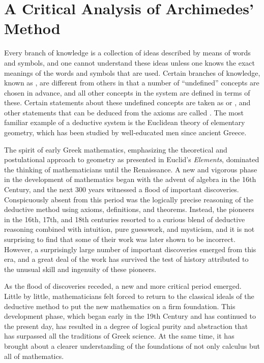 \section{A Critical Analysis of Archimedes' Method}\label{sec:1.1.5}

\begin{note}
  Every branch of knowledge is a collection of ideas described by means of words and symbols, and one cannot understand these ideas unless one knows the exact meanings of the words and symbols that are used.
  Certain branches of knowledge, known as \textbf{}, are different from others in that a number of ``undefined'' concepts are chosen in advance, and all other concepts in the system are defined in terms of these.
  Certain statements about these undefined concepts are taken as \textbf{} or \textbf{}, and other statements that can be deduced from the axioms are called \textbf{}.
  The most familiar example of a deductive system is the Euclidean theory of elementary geometry, which has been studied by well-educated men since ancient Greece.

  The spirit of early Greek mathematics, emphasizing the theoretical and postulational approach to geometry as presented in Euclid's \emph{Elements}, dominated the thinking of mathematicians until the Renaissance.
  A new and vigorous phase in the development of mathematics began with the advent of algebra in the 16th Century, and the next 300 years witnessed a flood of important discoveries.
  Conspicuously absent from this period was the logically precise reasoning of the deductive method using axioms, definitions, and theorems.
  Instead, the pioneers in the 16th, 17th, and 18th centuries resorted to a curious blend of deductive reasoning combined with intuition, pure guesswork, and mysticism, and it is not surprising to find that some of their work was later shown to be incorrect.
  However, a surprisingly large number of important discoveries emerged from this era, and a great deal of the work has survived the test of history attributed to the unusual skill and ingenuity of these pioneers.

  As the flood of discoveries receded, a new and more critical period emerged.
  Little by little, mathematicians felt forced to return to the classical ideals of the deductive method to put the new mathematics on a firm foundation.
  This development phase, which began early in the 19th Century and has continued to the present day, has resulted in a degree of logical purity and abstraction that has surpassed all the traditions of Greek science.
  At the same time, it has brought about a clearer understanding of the foundations of not only calculus but all of mathematics.


\end{note}
